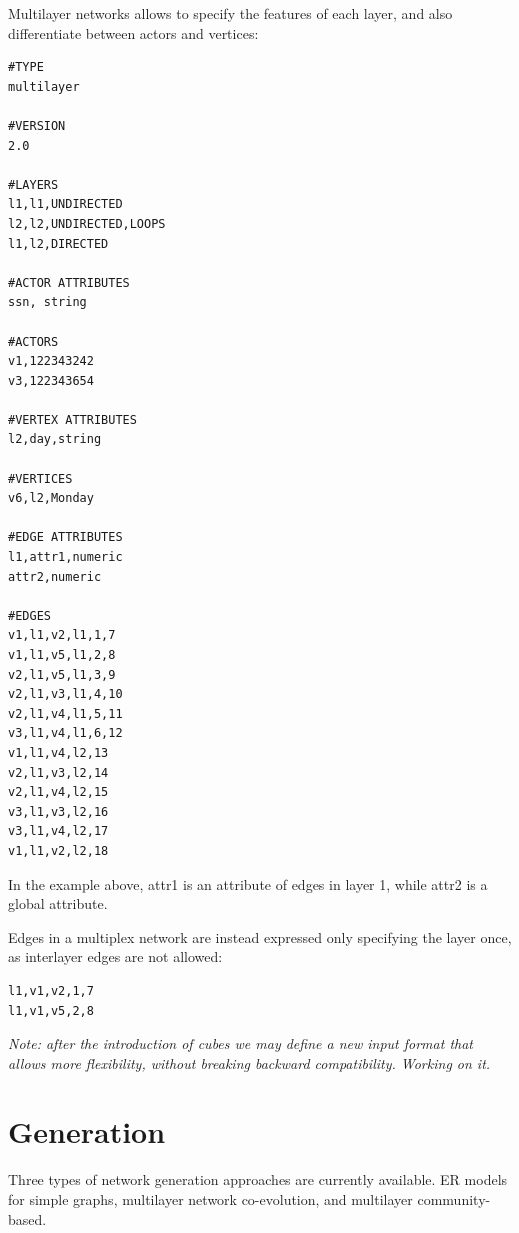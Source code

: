Multilayer networks allows to specify the features of each layer, and also differentiate between actors and vertices:
\begin{lstlisting}[style=file]
#TYPE                
multilayer           
                     
#VERSION             
2.0                  
                     
#LAYERS              
l1,l1,UNDIRECTED     
l2,l2,UNDIRECTED,LOOPS
l1,l2,DIRECTED       
                     
#ACTOR ATTRIBUTES    
ssn, string          
                     
#ACTORS              
v1,122343242         
v3,122343654         
                     
#VERTEX ATTRIBUTES   
l2,day,string        
                     
#VERTICES            
v6,l2,Monday         
                     
#EDGE ATTRIBUTES     
l1,attr1,numeric 
attr2,numeric   
                     
#EDGES               
v1,l1,v2,l1,1,7      
v1,l1,v5,l1,2,8      
v2,l1,v5,l1,3,9      
v2,l1,v3,l1,4,10     
v2,l1,v4,l1,5,11     
v3,l1,v4,l1,6,12     
v1,l1,v4,l2,13       
v2,l1,v3,l2,14       
v2,l1,v4,l2,15       
v3,l1,v3,l2,16       
v3,l1,v4,l2,17       
v1,l1,v2,l2,18       
\end{lstlisting}
In the example above, attr1 is an attribute of edges in layer 1, while attr2 is a global attribute.


Edges in a multiplex network are instead expressed only specifying the layer once, as interlayer edges are not allowed:

\begin{lstlisting}[style=file]              
l1,v1,v2,1,7      
l1,v1,v5,2,8  
\end{lstlisting}

\emph{Note: after the introduction of cubes we may define a new input format that allows more flexibility, without breaking backward compatibility. Working on it.}

\section{Generation}

Three types of network generation approaches are currently available. ER models for simple graphs, multilayer network co-evolution, and multilayer community-based.

